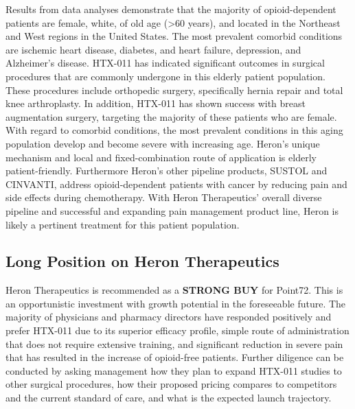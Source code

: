 \documentclass[11pt]{article}
\begin{document}
Results from data analyses demonstrate that the majority of
opioid-dependent patients are female, white, of old age
(\textgreater{}60 years), and located in the Northeast and West regions
in the United States. The most prevalent comorbid conditions are
ischemic heart disease, diabetes, and heart failure, depression, and
Alzheimer's disease. HTX-011 has indicated significant outcomes in
surgical procedures that are commonly undergone in this elderly patient
population. These procedures include orthopedic surgery, specifically
hernia repair and total knee arthroplasty. In addition, HTX-011 has
shown success with breast augmentation surgery, targeting the majority
of these patients who are female. With regard to comorbid conditions,
the most prevalent conditions in this aging population develop and
become severe with increasing age. Heron's unique mechanism and local
and fixed-combination route of application is elderly patient-friendly.
Furthermore Heron's other pipeline products, SUSTOL and CINVANTI,
address opioid-dependent patients with cancer by reducing pain and side
effects during chemotherapy. With Heron Therapeutics' overall diverse
pipeline and successful and expanding pain management product line,
Heron is likely a pertinent treatment for this patient population.

    \subsection{Long Position on Heron
Therapeutics}\label{long-position-on-heron-therapeutics}

Heron Therapeutics is recommended as a \textbf{STRONG BUY} for Point72.
This is an opportunistic investment with growth potential in the
foreseeable future. The majority of physicians and pharmacy directors
have responded positively and prefer HTX-011 due to its superior
efficacy profile, simple route of administration that does not require
extensive training, and significant reduction in severe pain that has
resulted in the increase of opioid-free patients. Further diligence can
be conducted by asking management how they plan to expand HTX-011
studies to other surgical procedures, how their proposed pricing
compares to competitors and the current standard of care, and what is
the expected launch trajectory.


    
    
    
    
\end{document}
